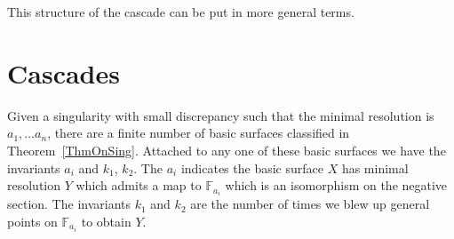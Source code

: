 \documentclass[12pt]{amsbook}
\theoremstyle{plain}
\newcommand{\mb}[1]{\mathbb{#1}}
\begin{document}
This structure of the cascade can be put in more general terms. 

\section{Cascades}
Given a singularity with small discrepancy such that the minimal resolution is $a_1, \dots a_n$, there are a finite number of basic surfaces classified in Theorem~\ref{ThmOnSing}. Attached to any one of these basic surfaces we have the invariants $a_i$ and $k_1$, $k_2$. The $a_i$ indicates the basic surface $X$ has minimal resolution $Y$ which admits a map to $\mb{F}_{a_i}$ which is an isomorphism on the negative section. The invariants $k_1$ and $k_2$ are the number of times we blew up general points on $\mb{F}_{a_i}$ to obtain $Y$.
\end{document}
